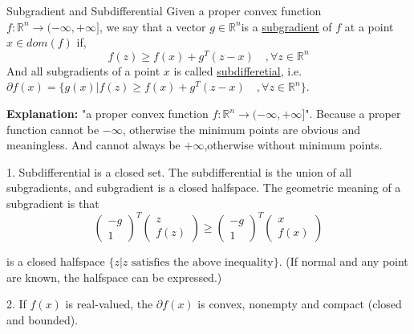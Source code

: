	\begin{defn}{Subgradient and Subdifferential}{}
		Given a proper convex function $f:\mathbb{R}^n \rightarrow (-\infty,+\infty]$, we say that a vector $g\in\mathbb{R}^n$is a \underline{subgradient} of $f$ at a point $x \in dom(f)$ if,
		$$f(z)\ge f(x)+g^T(z-x)\quad,\forall z\in\mathbb{R}^n$$
		And all subgradients of a point $x$ is called \underline{subdifferetial}, i.e. $\partial f(x)=\{g(x)| f(z)\ge f(x)+g^T(z-x)\quad,\forall z\in\mathbb{R}^n\}$.
		
		\textbf{Explanation:}
		 "a proper convex function $f:\mathbb{R}^n \rightarrow (-\infty,+\infty]$". Because a proper function cannot be $-\infty$, otherwise the minimum points are obvious and meaningless. And cannot always be $+\infty$,otherwise without minimum points.
		 
		
		\begin{Properties}{}{}
			1. Subdifferential is a closed set. The subdifferential is the union of all subgradients, and subgradient is a closed halfspace. The geometric meaning of a subgradient is that 
			$$
			\begin{pmatrix} -g \\1 \end{pmatrix}^T\begin{pmatrix} z \\f(z) \end{pmatrix} \ge \begin{pmatrix} -g \\1 \end{pmatrix}^T\begin{pmatrix} x \\f(x) \end{pmatrix}
			$$
			
			is a closed halfspace $\{z|z \text{ satisfies the above inequality}\}$. 
			(If normal and any point are known, the halfspace can be expressed.) 
			
			2. If $f(x)$ is real-valued, the $\partial f(x)$ is convex, nonempty and compact (closed and bounded).
		\end{Properties}
	\end{defn}


